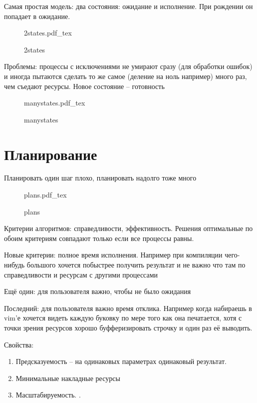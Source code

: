 \documentclass{book}
\theoremstyle{definition}
\newcommand{\incfig}[1]{%
    \def\svgwidth{\columnwidth}
    {#1.pdf_tex}
}
\begin{document}
Самая простая модель: два состояния: ожидание и исполнение. При рождении он попадает в ожидание.

\begin{figure}[!ht]
    \centering
    \incfig{2states}
    \caption{2states}
    \label{fig:2states}
\end{figure}

Проблемы: процессы с исключениями не умирают сразу (для обработки ошибок) и иногда пытаются сделать то же самое (деление на ноль например) много раз, чем съедают ресурсы. Новое состояние -- готовность

\begin{figure}[!ht]
    \centering
    \incfig{manystates}
    \caption{manystates}
    \label{fig:manystates}
\end{figure}

\section{Планирование}

Планировать один шаг плохо, планировать надолго тоже много

\begin{figure}[!ht]
    \centering
    \incfig{plans}
    \caption{plans}
    \label{fig:plans}
\end{figure}

Критерии алгоритмов: справедливости, эффективность. Решения оптимальные по обоим критериям совпадают только если все процессы равны.

Новые критерии: полное время исполнения. Например при компиляции чего-нибудь большого хочется побыстрее получить результат и не важно что там по справедливости и ресурсам с другими процессами

Ещё один: для пользователя важно, чтобы не было ожидания

Последний: для пользователя важно время отклика. Например когда набираешь в vim'е хочется видеть каждую буковку по мере того как она печатается, хотя с точки зрения ресурсов хорошо буфферизировать строчку и один раз её выводить.

Свойства:
\begin{enumerate}
    \item Предсказуемость -- на одинаковых параметрах одинаковый результат. 
    \item Минимальные накладные ресурсы
    \item Масштабируемость. .
\end{enumerate}
\end{document}

